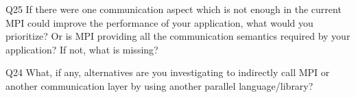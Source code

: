 \begin{description}%
\item{Q25} If there were one communication aspect which is not enough in the current MPI could improve the performance of your application, what would you prioritize? Or is MPI providing all the communication semantics required by your application? If not, what is missing?%
\item{Q24} What, if any, alternatives are you investigating to indirectly call MPI or another communication layer by using another parallel language/library?%
\end{description}%
